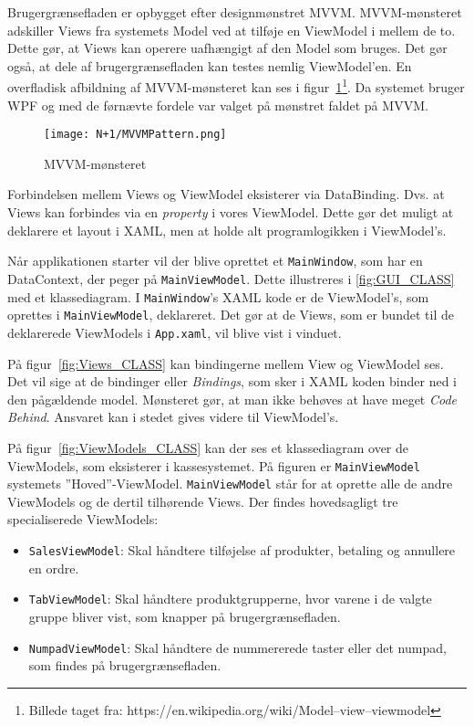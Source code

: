Brugergrænsefladen er opbygget efter designmønstret \gls{MVVM}. \gls{MVVM}-mønsteret adskiller Views fra systemets Model ved at tilføje en ViewModel i mellem de to. Dette gør, at Views kan operere uafhængigt af den Model som bruges. Det gør også, at dele af brugergrænsefladen kan testes nemlig ViewModel'en. En overfladisk afbildning af \gls{MVVM}-mønsteret kan ses i figur~\ref{fig:MVVM}\footnote{Billede taget fra: https://en.wikipedia.org/wiki/Model–view–viewmodel}. Da systemet bruger \gls{WPF} og med de førnævte fordele var valget på mønstret faldet på \gls{MVVM}.

\begin{figure}[H]
\centering
\texttt{[image: N+1/MVVMPattern.png]}
\caption{MVVM-mønsteret}
\label{fig:MVVM}
\end{figure}

Forbindelsen mellem Views og ViewModel eksisterer via DataBinding. Dvs. at Views kan forbindes via en \textit{property} i vores ViewModel. Dette gør det muligt at deklarere et layout i \gls{XAML}, men at holde alt programlogikken i ViewModel's.


Når applikationen starter vil der blive oprettet et \texttt{MainWindow}, som har en DataContext, der peger på \texttt{MainViewModel}. Dette illustreres i \ref{fig:GUI_CLASS} med et klassediagram. I \texttt{MainWindow}'s \gls{XAML} kode er de ViewModel's, som oprettes i \texttt{MainViewModel}, deklareret. Det gør at de Views, som er bundet til de deklarerede ViewModels i \texttt{App.xaml}, vil blive vist i vinduet.


På figur~\ref{fig:Views_CLASS} kan bindingerne mellem View og ViewModel ses. Det vil sige at de bindinger eller \textit{Bindings}, som sker i \gls{XAML} koden binder ned i den pågældende model. Mønsteret gør, at man ikke behøves at have meget \textit{Code Behind}. Ansvaret kan i stedet gives videre til ViewModel's.


På figur~\ref{fig:ViewModels_CLASS} kan der ses et klassediagram over de ViewModels, som eksisterer i kassesystemet. På figuren er \texttt{MainViewModel} systemets ''Hoved''-ViewModel. \texttt{MainViewModel} står for at oprette alle de andre ViewModels og de dertil tilhørende Views. Der findes hovedsagligt tre specialiserede ViewModels:
\begin{itemize}
	\item \texttt{SalesViewModel}: Skal håndtere tilføjelse af produkter, betaling og annullere en ordre.
	\item \texttt{TabViewModel}: Skal håndtere produktgrupperne, hvor varene i de valgte gruppe bliver vist, som knapper på brugergrænsefladen.
	\item \texttt{NumpadViewModel}: Skal håndtere de nummererede taster eller det numpad, som findes på brugergrænsefladen.
\end{itemize}

